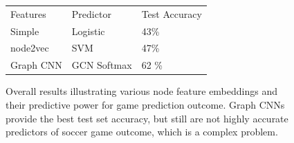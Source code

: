 \begin{figure}[h]
  \label{fig:results_table}
  \centering
    \begin{tabular}{l | l | l}
        \rowcolor{gray!20}
        Features & Predictor & Test Accuracy  \\
        \noalign{\smallskip}\hline\noalign{\smallskip}
        \rowcolor{green!20}
        Simple &  Logistic & 43\% \\
        \rowcolor{blue!20}
        node2vec &  SVM & 47\% \\
        \rowcolor{purple!20}
        Graph CNN & GCN Softmax & 62 \% \\ 
    \end{tabular}
  \caption{Overall results illustrating various node feature embeddings and their predictive power for game prediction outcome. Graph CNNs provide the best test set accuracy, but still are not highly accurate predictors of soccer game outcome, which is a complex problem.}
\end{figure}


